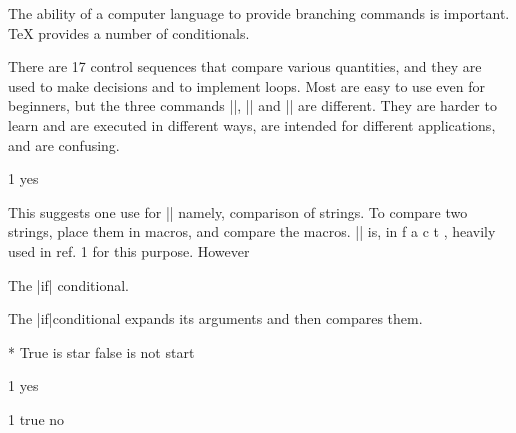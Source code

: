 \documentclass{article}
\begin{document}
The ability of a computer language to provide branching commands is important. TeX provides a number of conditionals.

There  are  17 control 
sequences  that   compare  various  quantities,  and  they are  used  to   make decisions  and  to  
implement  loops. Most  are  easy  to   use  even  for 
beginners, but  the  three commands  |\ifx|,   |\if|   and 
|\ifcat|   are different.  They are harder to  learn and are 
executed in different ways, are intended for different 
applications, and are confusing. 

\def\qwe#1{#1}   
\def\rty#1{#1}

\expandafter\expandafter\expandafter\ifx\qwe{1}\rty{1} 
{yes}
\fi 

This   suggests  one use  for  |\ifx|  
namely,  comparison  of  strings.  To  compare  two 
strings,  place  them  in  macros,  and  compare  the  
macros.  |\ifx|   is, in  f a c t ,  heavily used  in  ref.  1 for 
this  purpose.  However


The |if| conditional.

The |if|conditional expands its arguments and then compares them. 

\def\star#1{#1}

\if\star{*}* True is star 
   \else false is not start
\fi

\if\qwe{1}\rty{1} 
{yes}
\fi 

\def\test#1{
\def\zero{0}
\if\zero#1 true \else no\fi}


\test1
\end{document}
